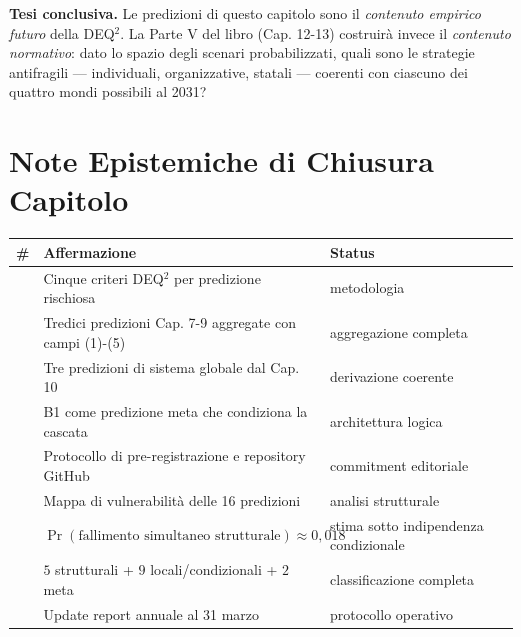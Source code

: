 \Hypoth{} \textbf{Tesi conclusiva.} Le predizioni di questo capitolo
sono il \emph{contenuto empirico futuro} della DEQ$^2$. La Parte V del
libro (Cap. 12-13) costruirà invece il \emph{contenuto normativo}: dato
lo spazio degli scenari probabilizzati, quali sono le strategie
antifragili --- individuali, organizzative, statali --- coerenti con
ciascuno dei quattro mondi possibili al 2031?



\section{Note Epistemiche di Chiusura
Capitolo}\label{note-epistemiche-di-chiusura-capitolo}

{\def\LTcaptype{none} %
{\small\begin{longtable}[]{@{}
  >{\raggedright\arraybackslash}p{}
  >{\raggedright\arraybackslash}p{}
  >{\raggedright\arraybackslash}p{}@{}}
\toprule\noalign{}
\begin{minipage}[b]{\linewidth}\raggedright
\#
\end{minipage} & \begin{minipage}[b]{\linewidth}\raggedright
Affermazione
\end{minipage} & \begin{minipage}[b]{\linewidth}\raggedright
Status
\end{minipage} \\
\midrule\noalign{}
\endhead
\bottomrule\noalign{}
\endlastfoot
1 & Cinque criteri DEQ$^2$ per predizione rischiosa & \Hypoth{}
metodologia \\
2 & Tredici predizioni Cap. 7-9 aggregate con campi (1)-(5) & \Proved{}
aggregazione completa \\
3 & Tre predizioni di sistema globale dal Cap. 10 & \Hypoth{}
derivazione coerente \\
4 & B1 come predizione meta che condiziona la cascata & \Hypoth{}
architettura logica \\
5 & Protocollo di pre-registrazione e repository GitHub & \Hypoth{}
commitment editoriale \\
6 & Mappa di vulnerabilità delle 16 predizioni & \Hypoth{} analisi
strutturale \\
7 & \(\Pr(\text{fallimento simultaneo strutturale}) \approx 0{,}018\) &
\Conj{} stima sotto indipendenza condizionale \\
8 & \(5\) strutturali + \(9\) locali/condizionali + \(2\) meta &
\Proved{} classificazione completa \\
9 & Update report annuale al 31 marzo & \Hypoth{} protocollo
operativo \\
\end{longtable}}
}



